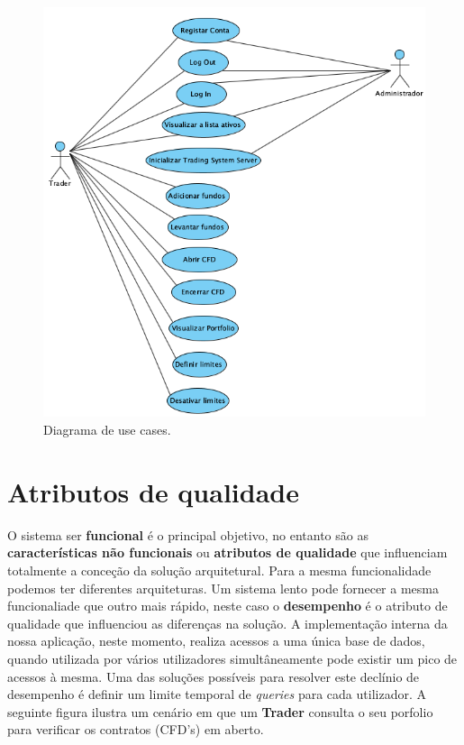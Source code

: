 \documentclass[11pt,a4paper]{report}%
\begin{document}
\begin{figure}[H]
	\centering
	\includegraphics[scale=0.6]{diagrama-use-cases.png}
	\caption{Diagrama de use cases. }
	\label{img:pag}
\end{figure}

\newpage

\section{Atributos de qualidade}

O sistema ser \textbf{funcional} é o principal objetivo, no entanto são as \textbf{características não funcionais} ou \textbf{atributos de qualidade} que influenciam totalmente a conceção da solução arquitetural. Para a mesma funcionalidade podemos ter diferentes arquiteturas. Um sistema lento pode fornecer a mesma funcionaliade que outro mais rápido, neste caso o \textbf{desempenho} é o atributo de qualidade que influenciou as diferenças na solução.
\newline
\newline
A implementação interna da nossa aplicação, neste momento, realiza acessos a uma única base de dados, quando utilizada por vários utilizadores simultâneamente pode existir um pico de acessos à mesma.
\newline
Uma das soluções possíveis para resolver este declínio de desempenho é definir um limite temporal de \emph{queries} para cada utilizador.
\newline 
A seguinte figura ilustra um cenário em que um \textbf{Trader} consulta o seu porfolio para verificar os contratos (CFD's) em aberto.
\end{document}
